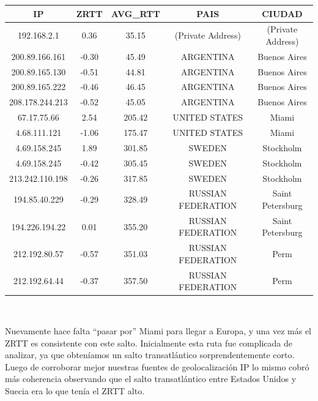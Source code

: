 \begin{tabular}{|c@{\hspace{5ex}}c@{\hspace{5ex}}c@{\hspace{5ex}}c@{\hspace{5ex}}c|}
\hline
\rule{0pt}{1.2em}IP & ZRTT & AVG\_RTT & PAIS & CIUDAD\\[0.2em]
\hline

\rule{0pt}{1.2em} 192.168.2.1  &  0.36 & 35.15 & (Private Address) & (Private Address) \\[0.2em]
\rule{0pt}{1.2em} 200.89.166.161  &  -0.30 & 45.49 & ARGENTINA & Buenos Aires \\[0.2em]
\rule{0pt}{1.2em} 200.89.165.130  &  -0.51 & 44.81 & ARGENTINA & Buenos Aires \\[0.2em]
\rule{0pt}{1.2em} 200.89.165.222  &  -0.46 & 46.45 & ARGENTINA & Buenos Aires \\[0.2em]
\rule{0pt}{1.2em} 208.178.244.213  &  -0.52 & 45.05 & ARGENTINA & Buenos Aires \\[0.2em]
\rule{0pt}{1.2em} 67.17.75.66  &  2.54 & 205.42 & UNITED STATES & Miami \\[0.2em]
\rule{0pt}{1.2em} 4.68.111.121  &  -1.06 & 175.47 & UNITED STATES & Miami \\[0.2em]
\rule{0pt}{1.2em} 4.69.158.245  &  1.89 & 301.85 & SWEDEN & Stockholm \\[0.2em]
\rule{0pt}{1.2em} 4.69.158.245  &  -0.42 & 305.45 & SWEDEN & Stockholm \\[0.2em]
\rule{0pt}{1.2em} 213.242.110.198  &  -0.26 & 317.85 & SWEDEN & Stockholm \\[0.2em]
\rule{0pt}{1.2em} 194.85.40.229  &  -0.29 & 328.49 & RUSSIAN FEDERATION & Saint Petersburg \\[0.2em]
\rule{0pt}{1.2em} 194.226.194.22  &  0.01 & 355.20 & RUSSIAN FEDERATION & Saint Petersburg \\[0.2em]
\rule{0pt}{1.2em} 212.192.80.57  &  -0.57 & 351.03 & RUSSIAN FEDERATION & Perm \\[0.2em]
\rule{0pt}{1.2em} 212.192.64.44  &  -0.37 & 357.50 & RUSSIAN FEDERATION & Perm \\[0.2em]
\hline
\end{tabular}

~

Nuevamente hace falta ``pasar por'' Miami para llegar a Europa, y una vez más el ZRTT es consistente con este salto.
Inicialmente esta ruta fue complicada de analizar, ya que obteníamos un salto transatlántico sorprendentemente corto.
Luego de corroborar mejor nuestras fuentes de geolocalización IP lo mismo cobró más coherencia observando que el salto transatlántico entre Estados Unidos y Suecia era lo que tenía el ZRTT alto.

